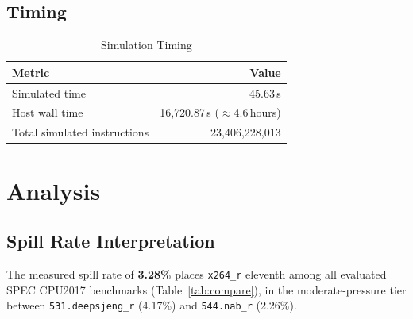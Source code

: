 \documentclass[conference]{IEEEtran}
\begin{document}
\subsection{Timing}

\begin{table}[H]
\centering
\caption{Simulation Timing}
\label{tab:timing}
\begin{tabular}{lr}
\toprule
\textbf{Metric} & \textbf{Value} \\
\midrule
Simulated time           & 45.63\,s \\
Host wall time           & 16{,}720.87\,s ($\approx$4.6\,hours) \\
Total simulated instructions & 23,406,228,013 \\
\bottomrule
\end{tabular}
\end{table}

\section{Analysis}

\subsection{Spill Rate Interpretation}

The measured spill rate of \textbf{3.28\%} places \texttt{x264\_r}
eleventh among all evaluated SPEC CPU2017 benchmarks
(Table~\ref{tab:compare}), in the moderate-pressure tier between
\texttt{531.deepsjeng\_r} (4.17\%) and \texttt{544.nab\_r} (2.26\%).
\end{document}
